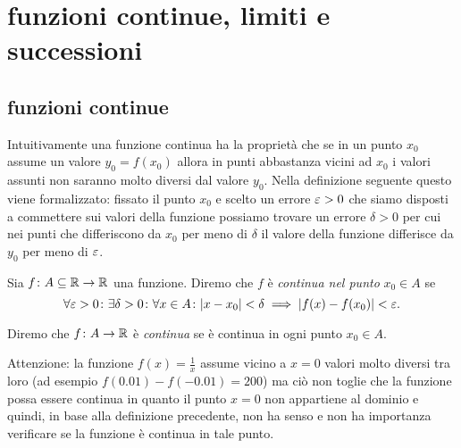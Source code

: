 \chapter{funzioni continue, limiti e successioni}
\label{ch:successioni}

\section{funzioni continue}
\label{sec:continuita}

Intuitivamente una funzione continua ha la proprietà
che se in un punto $x_0$ assume un valore $y_0=f(x_0)$ allora
in punti abbastanza vicini ad $x_0$ i valori assunti
non saranno molto diversi dal valore $y_0$.
Nella definizione seguente questo viene formalizzato:
fissato il punto $x_0$ e scelto un errore $\varepsilon>0$
che siamo disposti a commettere sui valori della funzione
possiamo trovare un errore $\delta>0$ per cui nei punti
che differiscono da $x_0$ per meno di $\delta$ il valore
della funzione differisce da $y_0$ per meno di $\varepsilon$.

\begin{definition}[continuità su $\RR$]
  \label{def:continua}%
  Sia $f\colon A \subseteq {\mathbb R} \to {\mathbb R}$ una funzione. Diremo che
  $f$ è \emph{continua nel punto}%
%
 $x_0\in A$ se
  \begin{equation}\label{eq:continuita}
  \forall \varepsilon>0 \colon \exists \delta>0 \colon
  \forall x\in A\colon
  {\left|x-x_0\right|} < \delta \implies {\left|f(x)-f(x_0)\right|} < \varepsilon.
  \end{equation}
  
  Diremo che $f\colon A \to {\mathbb R}$ 
  è \emph{continua}%
%
 se è continua in ogni punto $x_0 \in A$.
  \end{definition}
  
  
  Attenzione: la funzione $f(x)=\frac{1}{x}$
  assume vicino a $x=0$ valori molto diversi tra loro (ad esempio $f(0.01)-f(-0.01)=200$)
  ma ciò non toglie che la funzione possa essere continua in quanto il punto
  $x=0$ non appartiene al dominio e quindi,
  in base alla definizione precedente, non ha senso e non ha importanza
  verificare se la funzione è continua in tale punto.
  
